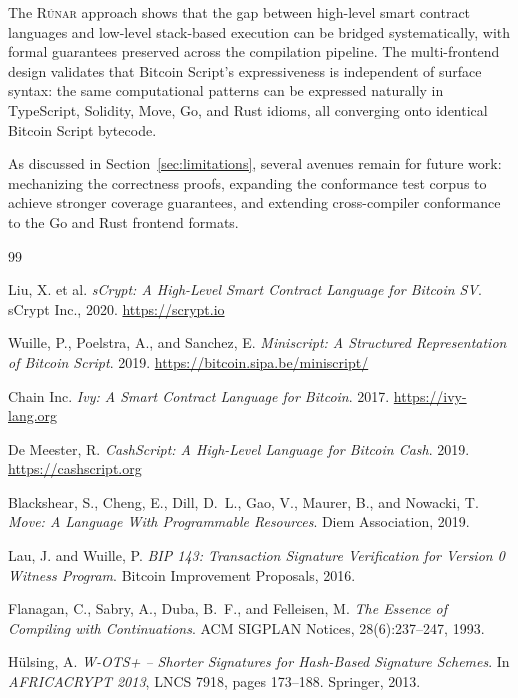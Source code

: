 \documentclass[11pt,a4paper]{article}
\newcommand{\runar}{\textsc{Rúnar}}
\begin{document}
The \runar{} approach shows that the gap between high-level smart contract
languages and low-level stack-based execution can be bridged systematically,
with formal guarantees preserved across the compilation pipeline. The
multi-frontend design validates that Bitcoin Script's expressiveness is
independent of surface syntax: the same computational patterns can be
expressed naturally in TypeScript, Solidity, Move, Go, and Rust idioms,
all converging onto identical Bitcoin Script bytecode.

As discussed in Section~\ref{sec:limitations}, several avenues remain for
future work: mechanizing the correctness proofs, expanding the conformance
test corpus to achieve stronger coverage guarantees, and extending
cross-compiler conformance to the Go and Rust frontend formats.


\begin{thebibliography}{99}

Liu, X. et al.
\textit{sCrypt: A High-Level Smart Contract Language for Bitcoin SV}.
sCrypt Inc., 2020.
\url{https://scrypt.io}

Wuille, P., Poelstra, A., and Sanchez, E.
\textit{Miniscript: A Structured Representation of Bitcoin Script}.
2019.
\url{https://bitcoin.sipa.be/miniscript/}

Chain Inc.
\textit{Ivy: A Smart Contract Language for Bitcoin}.
2017.
\url{https://ivy-lang.org}

De Meester, R.
\textit{CashScript: A High-Level Language for Bitcoin Cash}.
2019.
\url{https://cashscript.org}

Blackshear, S., Cheng, E., Dill, D.~L., Gao, V., Maurer, B., and Nowacki, T.
\textit{Move: A Language With Programmable Resources}.
Diem Association, 2019.

Lau, J. and Wuille, P.
\textit{BIP 143: Transaction Signature Verification for Version 0 Witness Program}.
Bitcoin Improvement Proposals, 2016.

Flanagan, C., Sabry, A., Duba, B.~F., and Felleisen, M.
\textit{The Essence of Compiling with Continuations}.
ACM SIGPLAN Notices, 28(6):237--247, 1993.

H{\"u}lsing, A.
\textit{W-OTS+ -- Shorter Signatures for Hash-Based Signature Schemes}.
In \textit{AFRICACRYPT 2013}, LNCS 7918, pages 173--188. Springer, 2013.

\end{thebibliography}
\end{document}
